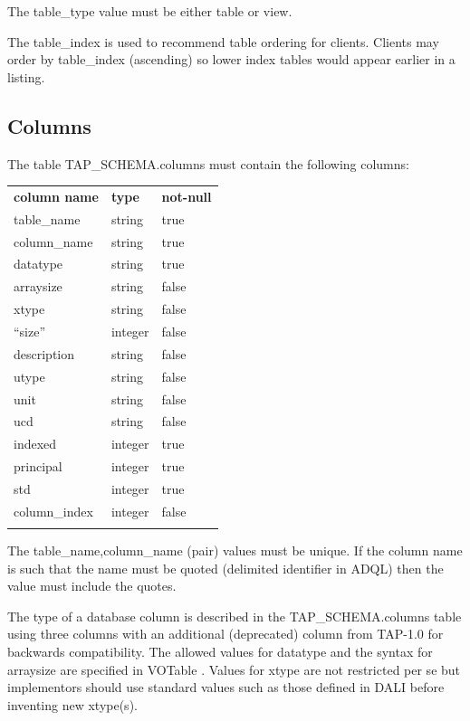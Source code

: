 \documentclass[11pt,letter]{ivoa}
\newcommand{\tapschema}{TAP\_SCHE\-MA}
\newcommand{\tapschema}{\mbox{%
  \relsize{-0.5}TAP\discretionary{-}{}{\kern-2pt\_}SCHEMA}}
\begin{document}
The table\_type value must be either table or view.

The table\_index is used to recommend table ordering for clients. Clients 
may order by table\_index (ascending) so lower index tables would appear 
earlier in a listing.

\subsection{Columns}
\label{sec:tap-schema-columns}
The table \tapschema.columns must contain the following columns:

\begin{inlinetable}
\begin{tabular}{l l l}
\sptablerule
\textbf{column name} & \textbf{type} & \textbf{not-null} \\
\sptablerule
table\_name & string & true \\
column\_name & string & true \\
datatype & string & true \\
arraysize & string & false \\
xtype & string & false \\
``size'' & integer & false \\
description & string & false \\
utype & string & false \\
unit & string & false \\
ucd & string & false \\
indexed & integer & true \\
principal & integer & true \\
std & integer & true \\
column\_index & integer & false \\
\sptablerule
\end{tabular}
\end{inlinetable}

The table\_name,column\_name (pair) values must be unique. If the column name is such that 
the name must be quoted (delimited identifier in ADQL) then the value must include the quotes.

The type of a database column is described in the \tapschema.columns
table using three columns with an additional (deprecated) column from TAP-1.0 
for backwards compatibility. The allowed values for datatype and the syntax for arraysize
are specified in VOTable \citep{2013ivoa.spec.0920O}. Values for xtype are not restricted per se but 
implementors should use standard values such as those defined in DALI before 
inventing new xtype(s). 
\end{document}
